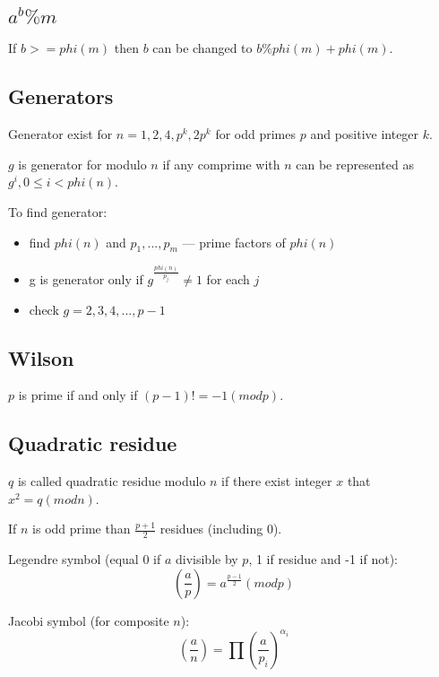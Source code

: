 \subsection{$a^b \% m$}
If $b >= phi(m)$ then $b$ can be changed to $b \% phi(m) + phi(m)$.

\subsection{Generators}
Generator exist for $n = 1, 2, 4, p^k, 2p^k$ for odd primes $p$ and positive integer $k$. 

$g$ is generator for modulo $n$ if any comprime with $n$ can be represented as $g^i, 0 \le i < phi(n)$.

To find generator:
\begin{itemize}
\item find $phi(n)$ and $p_1, ..., p_m$ --- prime factors of $phi(n)$
\item g is generator only if $g^{\frac{phi(n)}{p_j}} \ne 1$ for each $j$
\item check $g = 2, 3, 4, ..., p - 1$
\end{itemize}



\subsection{Wilson}
$p$ is prime if and only if $(p - 1)! = -1 (mod p)$.

\subsection{Quadratic residue}
$q$ is called quadratic residue modulo $n$ if there exist integer $x$ that $x^2 = q (mod n)$.

If $n$ is odd prime than $\frac{p + 1}{2}$ residues (including 0).

Legendre symbol (equal 0 if $a$ divisible by $p$, 1 if residue and -1 if not):
$$(\frac{a}{p}) = a^{\frac{p - 1}{2}} (mod p)$$

Jacobi symbol (for composite $n$):
$$(\frac{a}{n}) = \prod{(\frac{a}{p_i})^{\alpha_i}}$$
